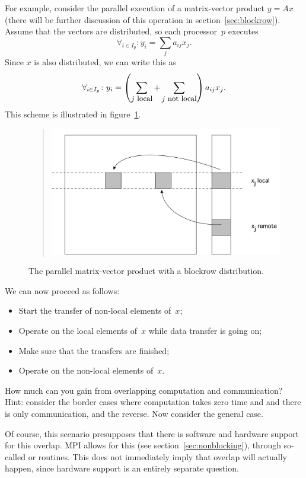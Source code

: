 For example, consider the parallel execution of a matrix-vector
product $y=Ax$ (there will be further discussion of this operation in
section~\ref{sec:blockrow}). Assume that the vectors are distributed,
so each processor~$p$ executes
\[ \forall_{i\in I_p}\colon y_i=\sum_j a_{ij}x_j. \]
Since $x$ is also distributed, we can write this as
\[ \forall_{i\in I_p}\colon y_i=
  \left(\sum_{\mbox{\small $j$ local}}
    +\sum_{\mbox{\small $j$ not local}} \right) a_{ij}x_j. 
\]
This scheme is illustrated in figure~\ref{fig:distmvp}.
\begin{figure}
  \begin{quote}
  \includegraphics[scale=.12]{graphics/distmvp}
  \end{quote}
  \caption{The parallel matrix-vector product with a blockrow
    distribution.}
  \label{fig:distmvp}
\end{figure}
We can now proceed as follows:
\begin{itemize}
\item Start the transfer of non-local elements of~$x$;
\item Operate on the local elements of~$x$ while data transfer is
  going on;
\item Make sure that the transfers are finished;
\item Operate on the non-local elements of~$x$.
\end{itemize}

\begin{exercise}
  How much can you gain from overlapping computation and
  communication?  Hint: consider the border cases where computation
  takes zero time and and there is only communication, and the
  reverse. Now consider the general case.
\end{exercise}

Of course, this scenario presupposes that there is software and
hardware support for this overlap. MPI allows for this (see
section~\ref{sec:nonblocking}), through so-called
 or  routines. This does not immediately imply that
overlap will actually happen, since hardware support is an entirely
separate question.


